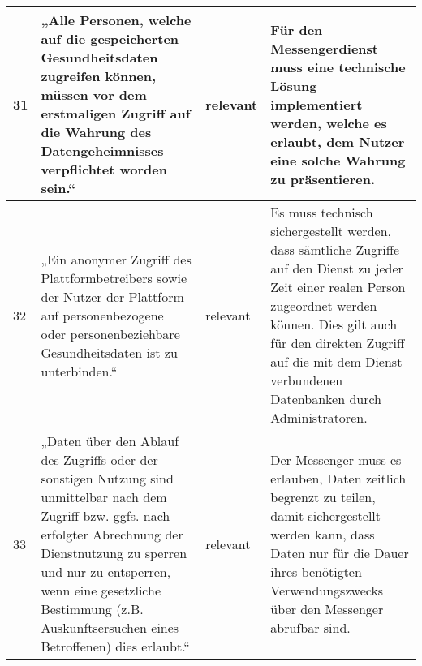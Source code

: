 \begin{longtable}{p{0.6cm}|p{6cm}|p{2cm}|p{6cm}}
    31     & „Alle Personen, welche auf die gespeicherten Gesundheitsdaten zugreifen können, müssen vor dem erstmaligen Zugriff auf die Wahrung des Datengeheimnisses verpflichtet worden sein.“                                                                                                                  & relevant           & Für den Messengerdienst muss eine technische Lösung implementiert werden, welche es erlaubt, dem Nutzer eine solche Wahrung zu präsentieren.                                                                                                                                                                                                                                                                                                                                                                                                                       \\ \hline
    32     & „Ein anonymer Zugriff des Plattformbetreibers sowie der Nutzer der Plattform auf personenbezogene oder personenbeziehbare Gesundheitsdaten ist zu unterbinden.“                                                                                                                                      & relevant           & Es muss technisch sichergestellt werden, dass sämtliche Zugriffe auf den Dienst zu jeder Zeit einer realen Person zugeordnet werden können. Dies gilt auch für den direkten Zugriff auf die mit dem Dienst verbundenen Datenbanken durch Administratoren.                                                                                                                                                                                                                                                                                                           \\ \hline
    33     & „Daten über den Ablauf des Zugriffs oder der sonstigen Nutzung sind unmittelbar nach dem Zugriff bzw. ggfs. nach erfolgter Abrechnung der Dienstnutzung zu sperren und nur zu entsperren, wenn eine gesetzliche Bestimmung (z.B. Auskunftsersuchen eines Betroffenen) dies erlaubt.“                 & relevant           & Der Messenger muss es erlauben, Daten zeitlich begrenzt zu teilen, damit sichergestellt werden kann, dass  Daten nur für die Dauer ihres benötigten Verwendungszwecks über den Messenger abrufbar sind.                                                                                                                                                                                                                                                                                                                                                             \\ \hline

\end{longtable}
